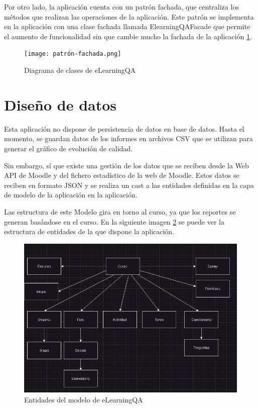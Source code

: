 Por otro lado, la aplicación cuenta con un patrón fachada, que centraliza los métodos que realizan las operaciones de la aplicación. Este patrón se implementa en la aplicación con una clase fachada llamada ElearningQAFacade que permite el aumento de funcionalidad sin que cambie mucho la fachada de la aplicación \ref{fig:diagrama-clases-elearningqa}.

\begin{figure}[H]
    \centering
    \texttt{[image: patrón-fachada.png]}
    \caption{Diagrama de clases de eLearningQA}
    \label{fig:diagrama-clases-elearningqa}
\end{figure}

\section{Diseño de datos}
Esta aplicación no dispone de persistencia de datos en base de datos. Hasta el momento, se guardan datos de los informes en archivos CSV que se utilizan para generar el gráfico de evolución de calidad. 

Sin embargo, sí que existe una gestión de los datos que se reciben desde la Web API de Moodle y del fichero estadístico de la web de Moodle. Estos datos se reciben en formato JSON y se realiza un cast a las entidades definidas en la capa de modelo de la aplicación en la aplicación. 

Las estructura de este Modelo gira en torno al curso, ya que los reportes se generan basándose en el curso. En la siguiente imagen \ref{fig:entidades} se puede ver la estructura de entidades de la que dispone la aplicación.

\begin{figure}[H]
    \centering
    \includegraphics[width=1\linewidth]{img/entidades-modelo.png}
    \caption{Entidades del modelo de eLearningQA}
    \label{fig:entidades}
\end{figure}

